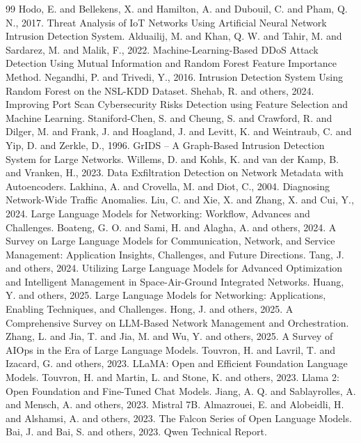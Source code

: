 \documentclass[12pt,a4paper]{article}
\begin{document}
\begin{thebibliography}{99}
 Hodo, E. and Bellekens, X. and Hamilton, A. and Dubouil, C. and Pham, Q. N., 2017. Threat Analysis of IoT Networks Using Artificial Neural Network Intrusion Detection System.
 Alduailij, M. and Khan, Q. W. and Tahir, M. and Sardarez, M. and Malik, F., 2022. Machine-Learning-Based DDoS Attack Detection Using Mutual Information and Random Forest Feature Importance Method.
 Negandhi, P. and Trivedi, Y., 2016. Intrusion Detection System Using Random Forest on the NSL-KDD Dataset.
 Shehab, R. and others, 2024. Improving Port Scan Cybersecurity Risks Detection using Feature Selection and Machine Learning.
 Staniford-Chen, S. and Cheung, S. and Crawford, R. and Dilger, M. and Frank, J. and Hoagland, J. and Levitt, K. and Weintraub, C. and Yip, D. and Zerkle, D., 1996. GrIDS -- A Graph-Based Intrusion Detection System for Large Networks.
 Willems, D. and Kohls, K. and van der Kamp, B. and Vranken, H., 2023. Data Exfiltration Detection on Network Metadata with Autoencoders.
 Lakhina, A. and Crovella, M. and Diot, C., 2004. Diagnosing Network-Wide Traffic Anomalies.
 Liu, C. and Xie, X. and Zhang, X. and Cui, Y., 2024. Large Language Models for Networking: Workflow, Advances and Challenges.
 Boateng, G. O. and Sami, H. and Alagha, A. and others, 2024. A Survey on Large Language Models for Communication, Network, and Service Management: Application Insights, Challenges, and Future Directions.
 Tang, J. and others, 2024. Utilizing Large Language Models for Advanced Optimization and Intelligent Management in Space-Air-Ground Integrated Networks.
 Huang, Y. and others, 2025. Large Language Models for Networking: Applications, Enabling Techniques, and Challenges.
 Hong, J. and others, 2025. A Comprehensive Survey on LLM-Based Network Management and Orchestration.
 Zhang, L. and Jia, T. and Jia, M. and Wu, Y. and others, 2025. A Survey of AIOps in the Era of Large Language Models.
 Touvron, H. and Lavril, T. and Izacard, G. and others, 2023. LLaMA: Open and Efficient Foundation Language Models.
 Touvron, H. and Martin, L. and Stone, K. and others, 2023. Llama 2: Open Foundation and Fine-Tuned Chat Models.
 Jiang, A. Q. and Sablayrolles, A. and Mensch, A. and others, 2023. Mistral 7B.
 Almazrouei, E. and Alobeidli, H. and Alshamsi, A. and others, 2023. The Falcon Series of Open Language Models.
 Bai, J. and Bai, S. and others, 2023. Qwen Technical Report.

\end{thebibliography}
\end{document}
